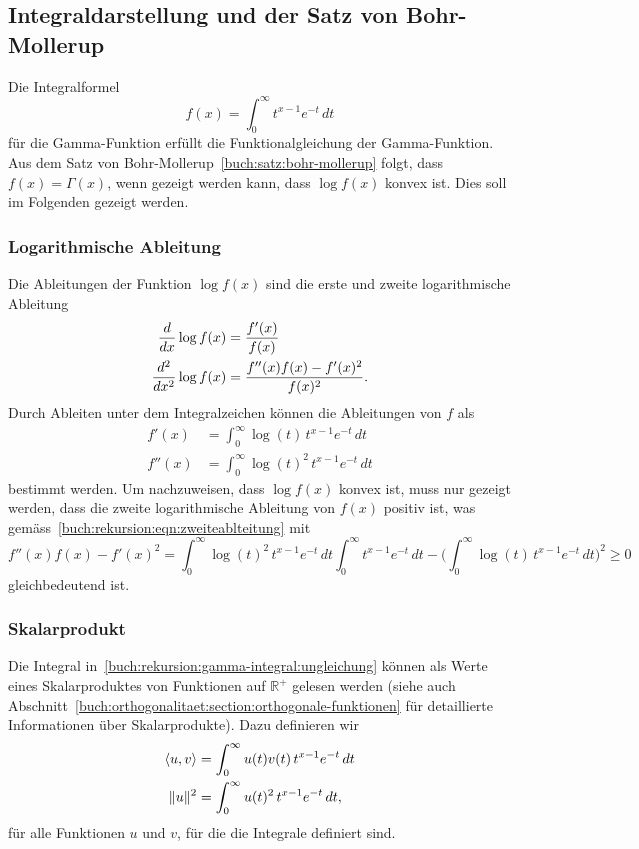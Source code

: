 %
%
%
\subsection{Integraldarstellung und der Satz von Bohr-Mollerup
\label{buch:subsection:integral-eindeutig}}
Die Integralformel
\[
f(x)
=
\int_0^\infty t^{x-1}e^{-t}\,dt
\]
für die Gamma-Funktion erfüllt die Funktionalgleichung der Gamma-Funktion.
Aus dem Satz von Bohr-Mollerup~\ref{buch:satz:bohr-mollerup} folgt,
dass $f(x)=\Gamma(x)$, wenn gezeigt werden kann, dass $\log f(x)$
konvex ist.
Dies soll im Folgenden gezeigt werden.

%
%
\subsubsection{Logarithmische Ableitung}
%
Die Ableitungen der Funktion $\log f(x)$ sind die erste und
zweite logarithmische
%
Ableitung
\begin{align}
\frac{d}{dx}\log f(x)
&=
\frac{f'(x)}{f(x)}
\notag
\\
\frac{d^2}{dx^2} \log f(x)
&=
\frac{f''(x)f(x)-f'(x)^2}{f(x)^2}.
\label{buch:rekursion:eqn:zweiteablteitung}
\end{align}
Durch Ableiten unter dem Integralzeichen können die Ableitungen
von $f$ als
\begin{align*}
f'(x)
&=
\int_0^\infty \log(t)\, t^{x-1} e^{-t}\,dt
\\
f''(x)
&=
\int_0^\infty \log(t)^2\, t^{x-1} e^{-t}\,dt
\end{align*}
bestimmt werden.
Um nachzuweisen, dass $\log f(x)$ konvex ist, muss nur gezeigt werden,
dass die zweite logarithmische Ableitung von $f(x)$ positiv ist, was
gemäss~\eqref{buch:rekursion:eqn:zweiteablteitung} mit
\begin{equation}
f''(x)f(x)-f'(x)^2
=
\int_0^\infty \log(t)^2\, t^{x-1}e^{-t}\,dt
\int_0^\infty t^{x-1}e^{-t}\,dt
-
\biggl(
\int_0^\infty \log(t)\, t^{x-1}e^{-t}\,dt
\biggr)^2
\ge 0
\label{buch:rekursion:gamma-integral:ungleichung}
\end{equation}
gleichbedeutend ist.

%
%
\subsubsection{Skalarprodukt}
Die Integral in~\eqref{buch:rekursion:gamma-integral:ungleichung}
können als Werte eines Skalarproduktes von Funktionen auf $\mathbb{R}^+$
%
gelesen werden (siehe auch
Abschnitt~\ref{buch:orthogonalitaet:section:orthogonale-funktionen}
für detaillierte Informationen über Skalarprodukte).
Dazu definieren wir
\begin{align}
\langle u,v\rangle
&=
\int_0^\infty u(t)v(t)\,t^{x-1}e^{-t}\,dt
\label{buch:rekursion:gamma-integral:eqn:skalarprodukt}
\\
\|u\|^2
&=
\int_0^\infty u(t)^2 \,t^{x-1}e^{-t}\,dt,
\notag
\end{align}
für alle Funktionen $u$ und $v$, für die die Integrale definiert sind.

